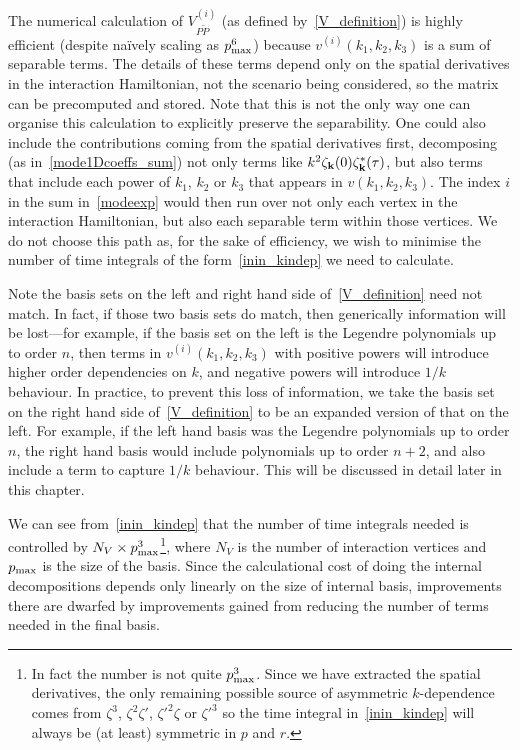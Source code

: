 The numerical calculation of $V^{(i)}_{P\tilde{P}}$ (as defined by~\eqref{V_definition}) is
highly efficient (despite na\"ively scaling as $p_\text{max}^6$) because $v^{(i)}(k_1, k_2,k_3)$
is a sum of separable terms. The details of these terms
depend only on the spatial derivatives in the interaction Hamiltonian, not the scenario being
considered, so the matrix can be precomputed and stored.
Note that this is not the only way one can organise this calculation to
explicitly preserve the separability. One could also include the contributions
coming from the spatial derivatives first, decomposing (as in~\eqref{mode1Dcoeffs_sum}) not only terms
like $k^{2} \zeta_{\bf k}(0)\zeta_{\bf k}^*(\tau)$, but also terms that include
each power of $k_1$, $k_2$ or $k_3$ that appears in $v(k_1,k_2,k_3)$. The index $i$
in the sum in~\eqref{modeexp} would then run over not only each vertex in the interaction
Hamiltonian, but also each separable term within those vertices.
We do not choose this path as, for the sake of efficiency, we wish to minimise the
number of time integrals of the form~\eqref{inin_kindep} we need to calculate.


Note the basis sets on the left and right hand side of~\eqref{V_definition}
need not match. In fact, if those two basis sets do match, then generically information
will be lost---for example, if the basis set on the left is the Legendre polynomials up to order $n$, then terms
in $v^{(i)}(k_1,k_2,k_3)$ with positive powers will introduce higher order
dependencies on $k$, and negative powers will introduce $1/k$ behaviour. In
practice, to prevent this loss of information, we take the basis set on the right hand
side of~\eqref{V_definition} to be an expanded version of that on the left. For
example, if the left hand basis was the Legendre polynomials up to order $n$, the right hand basis would
include polynomials up to order $n+2$, and also include a term to capture $1/k$ behaviour.
This will be discussed in detail later in this chapter.


We can see from~\eqref{inin_kindep} that the number of time integrals needed is controlled by
$N_V\times p_\text{max}^3$\footnote{In fact the number is not quite $p_\text{max}^3$.
Since we have extracted the spatial derivatives, the only remaining
possible source of asymmetric $k$-dependence
comes from $\zeta^3$, $\zeta^2\zeta'$, $\zeta'^2\zeta$ or $\zeta'^3$
so the time integral in~\eqref{inin_kindep} will always be (at least) symmetric in $p$ and $r$. },
where $N_V$ is the number of interaction vertices
and $p_\text{max}$ is the size of the basis.
Since the calculational cost of doing the internal decompositions depends only
linearly on the size of internal basis, improvements there are dwarfed by improvements
gained from reducing the number of terms needed in the final basis.


